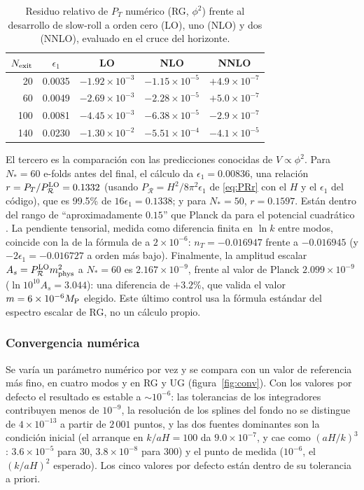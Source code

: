 \begin{table}[t]
\centering\small
\renewcommand{\arraystretch}{1.2}
\begin{tabular}{@{}rcccc@{}}
\toprule
$N_{\rm exit}$ & $\epsilon_1$ & LO & NLO & NNLO\\
\midrule
20 & 0.0035 & $-1.92\times10^{-3}$ & $-1.15\times10^{-5}$ & $+4.9\times10^{-7}$\\
60 & 0.0049 & $-2.69\times10^{-3}$ & $-2.28\times10^{-5}$ & $+5.0\times10^{-7}$\\
100 & 0.0081 & $-4.45\times10^{-3}$ & $-6.38\times10^{-5}$ & $-2.9\times10^{-7}$\\
140 & 0.0230 & $-1.30\times10^{-2}$ & $-5.51\times10^{-4}$ & $-4.1\times10^{-5}$\\
\bottomrule
\end{tabular}
\caption{Residuo relativo de $P_T$ numérico (RG, $\phi^2$) frente al desarrollo de slow-roll a orden cero (LO), uno (NLO) y dos (NNLO), evaluado en el cruce del horizonte.}
\label{tab:sr}
\end{table}

El tercero es la comparación con las predicciones conocidas de $V\propto\phi^2$. Para $N_*=60$ e-folds antes del final, el cálculo da $\epsilon_1=0.00836$, una relación $r=P_T/P_\mathcal{R}^{\rm LO}=0.1332$ (usando $P_\mathcal{R}=H^2/8\pi^2\epsilon_1$ de \eqref{eq:PRr} con el $H$ y el $\epsilon_1$ del código), que es 99.5\% de $16\epsilon_1=0.1338$; y para $N_*=50$, $r=0.1597$. Están dentro del rango de ``aproximadamente $0.15$'' que Planck da para el potencial cuadrático \cite{planck20}. La pendiente tensorial, medida como diferencia finita en $\ln k$ entre modos, coincide con la de la fórmula de \cite{martin14} a $2\times10^{-6}$: $n_T=-0.016947$ frente a $-0.016945$ (y $-2\epsilon_1=-0.016727$ a orden más bajo). Finalmente, la amplitud escalar $A_s=P_\mathcal{R}^{\rm LO}m_{\rm phys}^2$ a $N_*=60$ es $2.167\times10^{-9}$, frente al valor de Planck $2.099\times10^{-9}$ ($\ln10^{10}A_s=3.044$): una diferencia de $+3.2$\%, que valida el valor $m=6\times10^{-6}M_{\rm P}$ elegido. Este último control usa la fórmula estándar del espectro escalar de RG, no un cálculo propio.

\subsubsection{Convergencia numérica}

Se varía un parámetro numérico por vez y se compara con un valor de referencia más fino, en cuatro modos y en RG y UG (figura~\ref{fig:conv}). Con los valores por defecto el resultado es estable a $\sim10^{-6}$: las tolerancias de los integradores contribuyen menos de $10^{-9}$, la resolución de los splines del fondo no se distingue de $4\times10^{-13}$ a partir de $2\,001$ puntos, y las dos fuentes dominantes son la condición inicial (el arranque en $k/aH=100$ da $9.0\times10^{-7}$, y cae como $(aH/k)^3$: $3.6\times10^{-5}$ para $30$, $3.8\times10^{-8}$ para $300$) y el punto de medida ($10^{-6}$, el $(k/aH)^2$ esperado). Los cinco valores por defecto están dentro de su tolerancia a priori.

